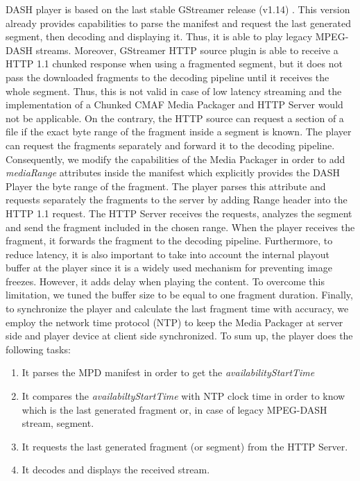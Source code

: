 DASH player is based on the last stable GStreamer release (v1.14) \cite{gstreamer}. This version already provides capabilities to parse the manifest and request the last generated segment, then decoding and displaying it. Thus, it is able to play legacy MPEG-DASH streams. Moreover, GStreamer HTTP source plugin is able to receive a HTTP 1.1 chunked response when using a fragmented segment, but it does not pass the downloaded fragments to the decoding pipeline until it receives the whole segment. Thus, this is not valid in case of low latency streaming and the implementation of a Chunked CMAF Media Packager and HTTP Server would not be applicable. On the contrary, the HTTP source can request a section of a file if the exact byte range of the fragment inside a segment is known. The player can request the fragments separately and forward it to the decoding pipeline. Consequently, we modify the capabilities of the Media Packager in order to add \textit{mediaRange} \cite{mediarange} attributes inside the manifest which explicitly provides the DASH Player the byte range of the fragment. The player parses this attribute and requests separately the fragments to the server by adding Range header \cite{range} into the HTTP 1.1 request. The HTTP Server receives the requests, analyzes the segment and send the fragment included in the chosen range. When the player receives the fragment, it forwards the fragment to the decoding pipeline. Furthermore, to reduce latency, it is also important to take into account the internal playout buffer at the player since it is a widely used mechanism for preventing image freezes. However, it adds delay when playing the content. To overcome this limitation, we tuned the buffer size to be equal to one fragment duration. Finally, to synchronize the player and calculate the last fragment time with accuracy, we employ the network time protocol (NTP) to keep the Media Packager at server side and player device at client side synchronized. To sum up, the player does the following tasks:
\begin{enumerate}
	\item It parses the MPD manifest in order to get the \textit{availabilityStartTime}
	\item It compares the \textit{availabiltyStartTime} with NTP clock time in order to know which is the last generated fragment or, in case of legacy MPEG-DASH stream, segment.
	\item It requests the last generated fragment (or segment) from the HTTP Server.
	\item It decodes and displays the received stream.
\end{enumerate}

